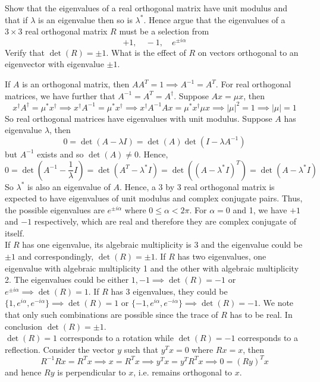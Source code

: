 \documentclass[a4paper]{article}
\begin{document}
\begin{qns}[Orthogonal]
Show that the eigenvalues of a real orthogonal matrix have unit modulus and that if $\lambda$ is an eigenvalue then so is $\lambda^*$. Hence argue that the eigenvalues of a $3\times3$ real orthogonal matrix $R$ must be a selection from
$$+1,\quad-1,\quad e^{\pm i\alpha}$$
Verify that $\det(R)=\pm1$. What is the effect of $R$ on vectors orthogonal to an eigenvector with eigenvalue $\pm1$.
\end{qns}
\begin{ans}
If $A$ is an orthogonal matrix, then $AA^T=1\implies A^{-1}=A^T$. For real orthogonal matrices, we have further that $A^{-1}=A^T=A^\dag$. Suppose $Ax=\mu x$, then
$$x^\dag A^\dag=\mu^*x^\dag\implies x^\dag A^{-1}=\mu^*x^\dag\implies x^\dag A^{-1}Ax=\mu^*x^\dag\mu x\implies|\mu|^2=1\implies|\mu|=1$$
So real orthogonal matrices have eigenvalues with unit modulus. Suppose $A$ has eigenvalue $\lambda$, then
$$0=\det(A-\lambda I)=\det(A)\det(I-\lambda A^{-1})$$
but $A^{-1}$ exists and so $\det(A)\neq 0$. Hence,
$$0=\det(A^{-1}-\frac{1}{\lambda}I)=\det(A^T-\lambda^*I)=\det((A-\lambda^*I)^T)=\det(A-\lambda^*I)$$
So $\lambda^*$ is also an eigenvalue of $A$. Hence, a 3 by 3 real orthogonal matrix is expected to have eigenvalues of unit modulus and complex conjugate pairs. Thus, the possible eigenvalues are $e^{\pm i\alpha}$ where $0\leq\alpha<2\pi$. For $\alpha=0$ and 1, we have $+1 $ and $-1$ respectively, which are real and therefore they are complex conjugate of itself.\\[5pt]
If $R$ has one eigenvalue, its algebraic multiplicity is 3 and the eigenvalue could be $\pm 1$ and correspondingly, $\det(R)=\pm 1$. If $R$ has two eigenvalues, one eigenvalue with algebraic multiplicity 1 and the other with algebraic multiplicity 2. The eigenvalues could be either $1,-1\implies\det(R)=-1$ or $e^{\pm i\alpha}\implies\det(R)=1$. If $R$ has 3 eigenvalues, they could be $\{1,e^{i\alpha},e^{-i\alpha}\}\implies\det(R)=1$ or $\{-1,e^{i\alpha},e^{-i\alpha}\}\implies\det(R)=-1$. We note that only such combinations are possible since the trace of $R$ has to be real. In conclusion $\det(R)=\pm 1$.\\[5pt]
$\det(R)=1$ corresponds to a rotation while $\det(R)=-1$ corresponds to a reflection. Consider the vector $y$ such that $y^Tx=0$ where $Rx=x$, then
$$R^{-1}Rx=R^Tx\implies x=R^Tx\implies y^Tx=y^TR^Tx\implies 0=(Ry)^Tx$$
and hence $Ry$ is perpendicular to $x$, i.e. remains orthogonal to $x$.
\end{ans}
\end{document}
